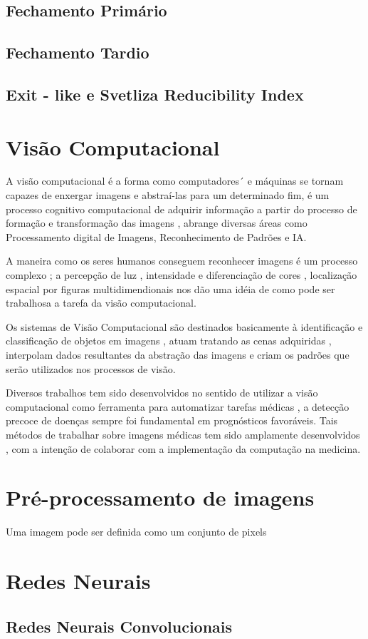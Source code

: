\subsection{Fechamento Primário}
\subsection{Fechamento Tardio }
\subsection{Exit - like e Svetliza Reducibility Index}
\cite{svetliza}




\newpage
\section{Visão Computacional}
A visão computacional é a forma como computadores´ e máquinas se tornam capazes de enxergar imagens e abstraí-las para um determinado fim, é um processo cognitivo computacional de adquirir informação a partir do processo de formação e transformação das imagens \cite{ballard} , abrange diversas áreas como Processamento digital de Imagens, Reconhecimento de Padrões e IA.

A maneira como os seres humanos conseguem reconhecer  imagens é um processo complexo ; a percepção de luz , intensidade e diferenciação de cores , localização espacial por figuras multidimendionais nos dão uma idéia de como pode ser trabalhosa a tarefa da visão computacional.


Os sistemas de Visão Computacional são destinados basicamente à identificação e classificação de objetos em imagens , atuam tratando as cenas adquiridas , interpolam dados resultantes da abstração das imagens e criam os padrões que serão utilizados nos processos de visão.

Diversos trabalhos tem sido desenvolvidos no sentido de utilizar a visão computacional como ferramenta para automatizar tarefas médicas \cite{avancos}
, a detecção precoce de doenças sempre foi fundamental em prognósticos favoráveis. Tais métodos de trabalhar sobre imagens médicas tem sido amplamente desenvolvidos   \cite{medical}, com a intenção de colaborar com a implementação da computação na medicina.




\section{Pré-processamento de imagens}
Uma imagem pode ser definida como um conjunto de pixels 
\cite{algorithmis}


\section{Redes Neurais}
\cite{deep}
\subsection{Redes Neurais Convolucionais}







